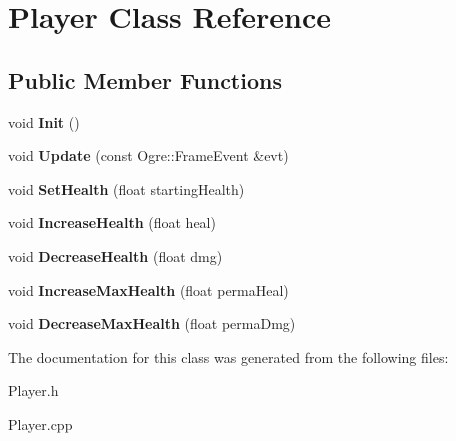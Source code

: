 \hypertarget{class_player}{}\section{Player Class Reference}
\label{class_player}
\subsection*{Public Member Functions}
\begin{DoxyCompactItemize}
\item 
\hypertarget{class_player_a4523bf2e637fcb0e36a3f456ec397e7d}{}void {\bfseries Init} ()\label{class_player_a4523bf2e637fcb0e36a3f456ec397e7d}

\item 
\hypertarget{class_player_aedadaadc4b2be53efe8207b9cf3b50ad}{}void {\bfseries Update} (const Ogre\+::\+Frame\+Event \&evt)\label{class_player_aedadaadc4b2be53efe8207b9cf3b50ad}

\item 
\hypertarget{class_player_ab81225d47569850e22ff8927a66b4efe}{}void {\bfseries Set\+Health} (float starting\+Health)\label{class_player_ab81225d47569850e22ff8927a66b4efe}

\item 
\hypertarget{class_player_a4e87364c8803665985f535f912a2d1a7}{}void {\bfseries Increase\+Health} (float heal)\label{class_player_a4e87364c8803665985f535f912a2d1a7}

\item 
\hypertarget{class_player_adfbc2c59369c8079209c6e087986fe57}{}void {\bfseries Decrease\+Health} (float dmg)\label{class_player_adfbc2c59369c8079209c6e087986fe57}

\item 
\hypertarget{class_player_a0e6e393f12e0dae925ae1f2e8c14ac84}{}void {\bfseries Increase\+Max\+Health} (float perma\+Heal)\label{class_player_a0e6e393f12e0dae925ae1f2e8c14ac84}

\item 
\hypertarget{class_player_abd5de3d62331db677bf314d234b1b67c}{}void {\bfseries Decrease\+Max\+Health} (float perma\+Dmg)\label{class_player_abd5de3d62331db677bf314d234b1b67c}

\end{DoxyCompactItemize}


The documentation for this class was generated from the following files\+:\begin{DoxyCompactItemize}
\item 
Player.\+h\item 
Player.\+cpp\end{DoxyCompactItemize}
